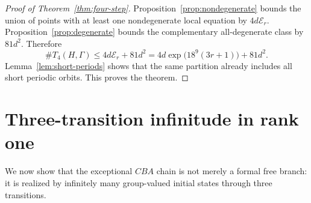 \documentclass[11pt]{article}
\theoremstyle{definition}
\theoremstyle{remark}
\newcommand{\Er}{\mathcal{E}_{r}}
\begin{document}
\begin{proof}[Proof of Theorem~\ref{thm:four-step}]
Proposition~\ref{prop:nondegenerate} bounds the union of points with at least
one nondegenerate local equation by \(4d\Er\).
Proposition~\ref{prop:degenerate} bounds the complementary all-degenerate
class by \(81d^2\).  Therefore
\[
 \#T_4(H,\Gamma)
 \le4d\Er+81d^2
 =
 4d\exp\!\bigl(18^9(3r+1)\bigr)+81d^2.
\]
Lemma~\ref{lem:short-periods} shows that the same partition already includes
all short periodic orbits.  This proves the theorem.
\end{proof}

\section{Three-transition infinitude in rank one}\label{sec:sharpness}

We now show that the exceptional \(CBA\) chain is not merely a formal free
branch: it is realized by infinitely many group-valued initial states
through three transitions.
\end{document}
